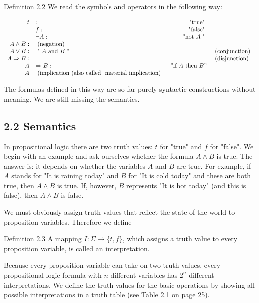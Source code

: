 \documentclass[10pt]{book}
\begin{document}
Definition 2.2 We read the symbols and operators in the following way:

$$
\begin{array}{rlrl}
t & : & \text { "true" } & \\
& f: & \text { "false" } & \\
& \neg A: & \text { "not } A \text { " } & \\
A \wedge B: & \text { (negation) } \\
A \vee B: & \text { " } A \text { and } B \text { " } & & \text { (conjunction) } \\
A \Rightarrow B: & & & \text { (disjunction) } \\
A & \Rightarrow B: & \text { "if } A \text { then } B " & \\
A & \text { (implication (also called } \text { material implication) }
\end{array}
$$

The formulas defined in this way are so far purely syntactic constructions without meaning. We are still missing the semantics.

\subsection*{2.2 Semantics}
In propositional logic there are two truth values: $t$ for "true" and $f$ for "false". We begin with an example and ask ourselves whether the formula $A \wedge B$ is true. The answer is: it depends on whether the variables $A$ and $B$ are true. For example, if $A$ stands for "It is raining today" and $B$ for "It is cold today" and these are both true, then $A \wedge B$ is true. If, however, $B$ represents "It is hot today" (and this is false), then $A \wedge B$ is false.

We must obviously assign truth values that reflect the state of the world to proposition variables. Therefore we define

\begin{displayquote}
Definition 2.3 A mapping $I: \Sigma \rightarrow\{t, f\}$, which assigns a truth value to every proposition variable, is called an interpretation.
\end{displayquote}

Because every proposition variable can take on two truth values, every propositional logic formula with $n$ different variables has $2^{n}$ different interpretations. We define the truth values for the basic operations by showing all possible interpretations in a truth table (see Table 2.1 on page 25).
\end{document}
